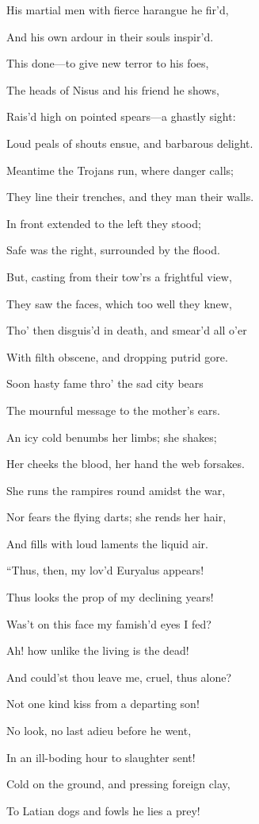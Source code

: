 His martial men with fierce harangue he fir’d,

And his own ardour in their souls inspir’d.

This done—to give new terror to his foes,

The heads of Nisus and his friend he shows,

Rais’d high on pointed spears—a ghastly sight:

Loud peals of shouts ensue, and barbarous delight.

Meantime the Trojans run, where danger calls;

They line their trenches, and they man their walls.

In front extended to the left they stood;

Safe was the right, surrounded by the flood.

But, casting from their tow’rs a frightful view,

They saw the faces, which too well they knew,

Tho’ then disguis’d in death, and smear’d all o’er

With filth obscene, and dropping putrid gore.

Soon hasty fame thro’ the sad city bears

The mournful message to the mother’s ears.

An icy cold benumbs her limbs; she shakes;

Her cheeks the blood, her hand the web forsakes.

She runs the rampires round amidst the war,

Nor fears the flying darts; she rends her hair,

And fills with loud laments the liquid air.

“Thus, then, my lov’d Euryalus appears!

Thus looks the prop of my declining years!

Was’t on this face my famish’d eyes I fed?

Ah! how unlike the living is the dead!

And could’st thou leave me, cruel, thus alone?

Not one kind kiss from a departing son!

No look, no last adieu before he went,

In an ill-boding hour to slaughter sent!

Cold on the ground, and pressing foreign clay,

To Latian dogs and fowls he lies a prey!

